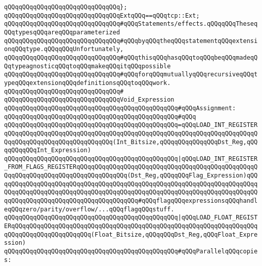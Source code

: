 \verb|qQQqqQQqqQQqqQQqqQQqqQQqqQQqqQQq};|\newline
\verb|qQQqqQQqqQQqqQQqqQQqqQQqqQQqqQQqExtqQQq==qQQqtcp::Ext;|\newline
\newline
\newline
\verb|qQQqqQQqqQQqqQQqqQQqqQQqqQQqqQQq#qQQqStatements/effects.qQQqqQQqTheseqQQqtypesqQQqareqQQqparameterized|\newline
\verb|qQQqqQQqqQQqqQQqqQQqqQQqqQQqqQQq#qQQqbyqQQqtheqQQqstatementqQQqextensionqQQqtype.qQQqqQQqUnfortunately,|\newline
\verb|qQQqqQQqqQQqqQQqqQQqqQQqqQQqqQQq#qQQqthisqQQqhasqQQqtoqQQqbeqQQqmadeqQQqtypeagnosticqQQqtoqQQqmakeqQQqitqQQqpossible|\newline
\verb|qQQqqQQqqQQqqQQqqQQqqQQqqQQqqQQq#qQQqforqQQqmutuallyqQQqrecursiveqQQqtypeqQQqextensionqQQqdefinitionsqQQqtoqQQqwork.|\newline
\verb|qQQqqQQqqQQqqQQqqQQqqQQqqQQqqQQq#|\newline
\verb|qQQqqQQqqQQqqQQqqQQqqQQqqQQqqQQqVoid_Expression|\newline
\newline
\verb|qQQqqQQqqQQqqQQqqQQqqQQqqQQqqQQqqQQqqQQqqQQqqQQq#qQQqAssignment:|\newline
\verb|qQQqqQQqqQQqqQQqqQQqqQQqqQQqqQQqqQQqqQQqqQQqqQQq#qQQq|\newline
\verb|qQQqqQQqqQQqqQQqqQQqqQQqqQQqqQQqqQQqqQQqqQQqqQQq=qQQqLOAD_INT_REGISTERqQQqqQQqqQQqqQQqqQQqqQQqqQQqqQQqqQQqqQQqqQQqqQQqqQQqqQQqqQQqqQQqqQQqqQQqqQQqqQQqqQQqqQQqqQQqqQQqqQQq(Int_Bitsize,qQQqqQQqqQQqqQQqDst_Reg,qQQqqQQqqQQqInt_Expression)|\newline
\verb|qQQqqQQqqQQqqQQqqQQqqQQqqQQqqQQqqQQqqQQqqQQqqQQq|\verb#|qQQqLOAD_INT_REGISTER_FROM_FLAGS_REGISTERqQQqqQQqqQQqqQQqqQQqqQQqqQQqqQQqqQQqqQQqqQQqqQQqqQQqqQQqqQQqqQQqqQQqqQQqqQQqqQQqqQQq(Dst_Reg,qQQqqQQqFlag_Expression)qQQqqQQqqQQqqQQqqQQqqQQqqQQqqQQqqQQqqQQqqQQqqQQqqQQqqQQqqQQqqQQqqQQqqQQqqQQqqQQqqQQqqQQqqQQqqQQqqQQqqQQqqQQqqQQqqQQqqQQqqQQqqQQqqQQqqQQqqQQqqQQqqQQqqQQqqQQqqQQqqQQqqQQqqQQqqQQqqQQq#\verb|#qQQqflagqQQqexpressionsqQQqhandleqQQqzero/parity/overflow/...qQQqflagqQQqstuff.|\newline
\verb|qQQqqQQqqQQqqQQqqQQqqQQqqQQqqQQqqQQqqQQqqQQqqQQq|\verb#|qQQqLOAD_FLOAT_REGISTERqQQqqQQqqQQqqQQqqQQqqQQqqQQqqQQqqQQqqQQqqQQqqQQqqQQqqQQqqQQqqQQqqQQqqQQqqQQqqQQqqQQqqQQqqQQq(Float_Bitsize,qQQqqQQqDst_Reg,qQQqFloat_Expression)#\newline
\newline
\verb|qQQqqQQqqQQqqQQqqQQqqQQqqQQqqQQqqQQqqQQqqQQqqQQq#qQQqParallelqQQqcopies:|\newline
